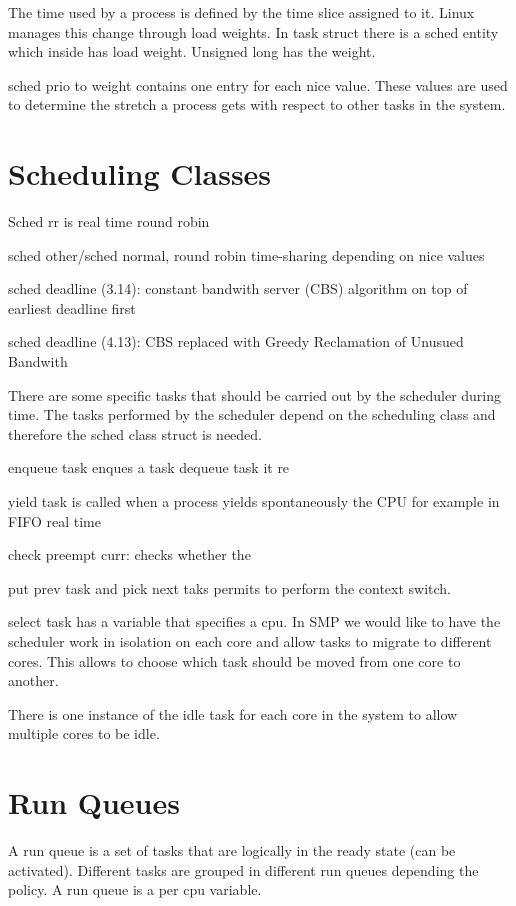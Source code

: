 \documentclass[twoside]{article}
\begin{document}
The time used by a process is defined by the time slice assigned to it. Linux
manages this change through load weights. In task struct there is a sched entity
which inside has load weight. Unsigned long has the weight.

sched prio to weight contains one entry for each nice value. These values are
used to determine the stretch a process gets with respect to other tasks in the
system.

\section{Scheduling Classes}
\label{sec:Scheduling Classes}


Sched rr is real time round robin

sched other/sched normal, round robin time-sharing depending on nice values

sched deadline (3.14): constant bandwith server (CBS) algorithm on top of
earliest deadline first

sched deadline (4.13): CBS replaced with Greedy Reclamation of Unusued Bandwith

There are some specific tasks that should be carried out by the scheduler during
time. The tasks performed by the scheduler depend on the scheduling class and
therefore the sched class struct is needed.

enqueue task enques a task
dequeue task it re

yield task is called when a process yields spontaneously the CPU for example in
FIFO real time

check preempt curr: checks whether the 

put prev task and pick next taks permits to perform the context switch.

select task has a variable that specifies a cpu. In SMP we would like to have
the scheduler work in isolation on each core and allow tasks to migrate to
different cores. This allows to choose which task should be moved from one core
to another.

There is one instance of the idle task for each core in the system to allow
multiple cores to be idle.

\section{Run Queues}
\label{sec:Run Queues}

A run queue is a set of tasks that are logically in the ready state (can be
activated). Different tasks are grouped in different run queues depending the
policy. A run queue is a per cpu variable.
\end{document}

